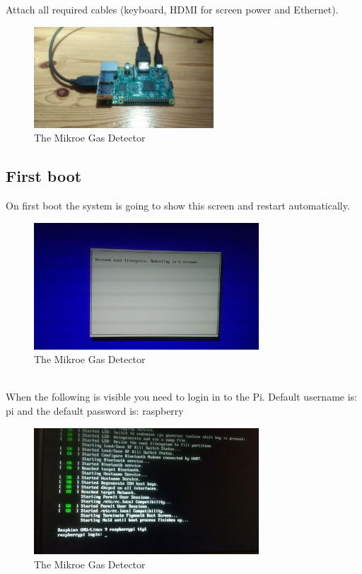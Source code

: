 \documentclass[11pt]{report}
\begin{document}
			Attach all required cables (keyboard, HDMI for screen power and Ethernet).
			\begin{figure}[ht]
				\centering
				\includegraphics[width=0.6\textwidth]{images/pi/install_cables.jpg} 
				\caption{The Mikroe Gas Detector}
			\end{figure}
			\newpage
		\subsection{First boot}
			On first boot the system is going to show this screen and restart automatically.
			\begin{figure}[ht]
				\centering
				\includegraphics[width=0.75\textwidth]{images/pi/install_first_boot.jpg} 
				\caption{The Mikroe Gas Detector}
			\end{figure}\\
			When the following is visible you need to login in to the Pi. Default username is: pi and the default password is: raspberry
			\begin{figure}[ht]
				\centering
				\includegraphics[width=0.75\textwidth]{images/pi/first_login.jpg} 
				\caption{The Mikroe Gas Detector}
			\end{figure}
\end{document}
